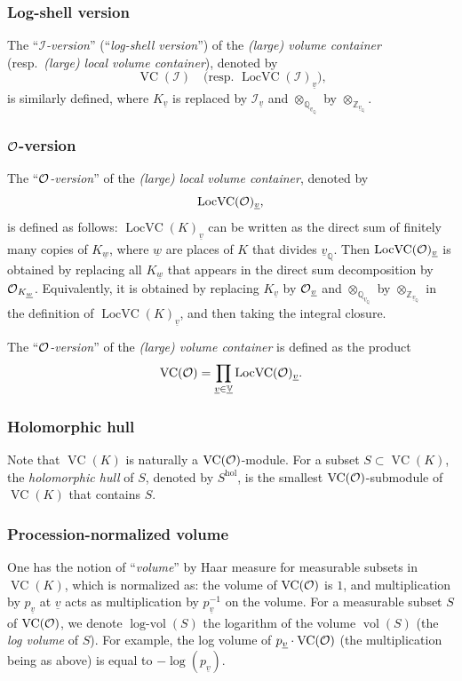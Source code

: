 \documentclass[12pt, reqno, a4paper]{amsart}
\def\udl#1{\underline{#1}} %
\def\bZ{\mathbb{Z}} %
\def\bQ{\mathbb{Q}} %
\def\bV{\mathbb{V}}
\def\cI{{\mathcal{I}}}
\def\uV{\udl{\bV}} %
\def\uv{\udl{v}} %
\DeclareMathOperator{\vol}{vol}
\DeclareMathOperator{\logvol}{log-vol}
\DeclareMathOperator{\hol}{hol}
\DeclareMathOperator{\VC}{VC}
\DeclareMathOperator{\LocVC}{LocVC}
\begin{document}
\subsubsection{Log-shell version}
The ``\emph{$\cI$-version}'' (``\emph{log-shell version}'') of the \emph{(large) volume container} (resp.\ \emph{(large) local volume container}), denoted by 
$$
\VC(\cI)\quad \text{(resp.\ $\LocVC(\cI)_{\uv}$),}
$$
is similarly defined, where $K_{\uv}$ is replaced by $\cI_{\uv}$ and $\otimes_{\bQ_{\uv_{\bQ}}}$ by $\otimes_{\bZ_{\uv_{\bQ}}}$.


\subsubsection{$\OO$-version}
The ``\emph{$\OO$-version}'' of the \emph{(large) local volume container}, denoted by
$$
\LocVC(\OO)_{\uv},
$$
is defined as follows:
$\LocVC(K)_{\uv}$ can be written as the direct sum of finitely many copies of $K_{\udl{w}}$, where $\udl{w}$ are places of $K$ that divides $\uv_{\bQ}$. Then $\LocVC(\OO)_{\uv}$ is obtained by replacing all $K_{\udl{w}}$ that appears in the direct sum decomposition by $\OO_{K_{\udl{w}}}$.
Equivalently, it is obtained by replacing $K_{\uv}$ by $\OO_{\uv}$ and $\otimes_{\bQ_{\uv_{\bQ}}}$ by $\otimes_{\bZ_{\uv_{\bQ}}}$ in the definition of $\LocVC(K)_{\uv}$, and then taking the integral closure.

The ``\emph{$\OO$-version}'' of the \emph{(large) volume container} is defined as the product
$$
\VC(\OO)=\prod_{\uv\in \uV}\LocVC(\OO)_{\uv}.
$$

\subsubsection{Holomorphic hull}
Note that $\VC(K)$ is naturally a $\VC(\OO)$-module.
For a subset $S\subset\VC(K)$, the \emph{holomorphic hull} of $S$, denoted by $S^{\hol}$, is the smallest $\VC(\OO)$-submodule of $\VC(K)$ that contains $S$. 

\subsubsection{Procession-normalized volume}\label{subsub:procNormLogVol}
One has the notion of ``\emph{volume}'' by Haar measure for measurable subsets in $\VC(K)$, which is normalized as: the volume of $\VC(\OO)$ is $1$, and multiplication by $p_{\uv}$ at $\uv$ acts as multiplication by $p_{\uv}^{-1}$ on the volume. 
For a measurable subset $S$ of $\VC(\OO)$, we denote $\logvol(S)$ the logarithm of the volume $\vol(S)$ (the \emph{log volume} of $S$).
For example, the log volume of $p_{\uv}\cdot\VC(\OO)$ (the multiplication being as above) is equal to $-\log (p_{\uv})$.
\end{document}

